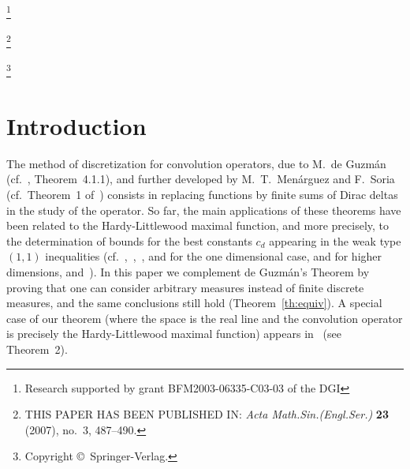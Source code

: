 \documentclass[12pt,a4paper]{amsart}
\theoremstyle{plain}
\theoremstyle{remark}
\begin{document}
\thanks{Research supported by grant
BFM2003-06335-C03-03 of the DGI}


\thanks{THIS PAPER HAS BEEN PUBLISHED IN: \textit{Acta Math.\@ Sin.\@ (Engl.\@ Ser.\@)}
\textbf{23} (2007), no.~3, 487--490.}

\thanks{Copyright \copyright\ Springer-Verlag.}


\begin{abstract}
We show that in the study of certain convolution operators,
functions can be replaced by measures without changing the size of the
constants appearing in weak type $(1,1)$ inequalities. As an application,
we prove that the best constants for the centered
Hardy-Littlewood maximal operator associated to parallelotopes do not
decrease with the dimension.
\end{abstract}

\maketitle


\section{Introduction}

The method of discretization for convolution
operators, due to M.~de Guzm\'an
(cf.~\cite{Guz}, Theorem~4.1.1), and further developed by
M.~T.~Me\-n\'ar\-guez and F.~Soria (cf.~Theorem~1 of~\cite{MeSo})
consists in replacing functions by finite sums of Dirac
deltas in the study of the operator.
So far, the main applications of these theorems have been
related to the Hardy-Littlewood maximal function, and
more precisely, to the determination of bounds for the best
constants $c_d$ appearing in the weak type $(1,1)$ inequalities
(cf.~\cite{MeSo},~\cite{A1},~\cite{Mel1}, and \cite{Mel2} for the
one dimensional case, and for higher dimensions,
\cite{MeSo} and~\cite{A2}).
In this paper we complement de Guzm\'an's Theorem by proving
that one can
consider arbitrary measures instead of finite discrete measures, and the same
conclusions still hold (Theorem~\ref{th:equiv}). A special case of our
theorem (where the space is the real line and the convolution operator
is precisely the Hardy-Littlewood maximal function) appears
in~\cite{Mel2} (see Theorem~2).
\end{document}
